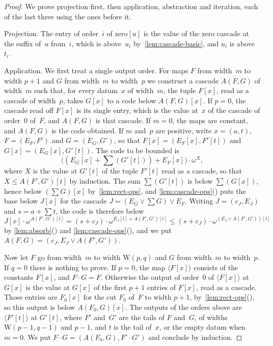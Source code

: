 \documentclass[11pt]{amsart}
\newcommand{\bplus}{\mathbin{+}}
\newcommand{\btimes}{\mathbin{\cdot}}
\newcommand{\W}{\mathrm{W}}
\newcommand{\tsum}[1]{\textstyle\sum #1}
\newcommand{\act}[2]{#1[#2]}                  %
\newcommand{\rd}[1]{\langle #1 \rangle}       %
\theoremstyle{plain}
\theoremstyle{definition}
\begin{document}
\begin{proof}
We prove projection first, then application, abstraction and
iteration, each of the last three using the ones before it.

Projection. The entry of order~$i$ of $\act{\mathrm{zero}}{u}$ is the
value of the zero cascade at the suffix of~$u$ from~$i$, which is
above~$u_i$ by~\cref{lem:cascade-basic}, and $u_i$ is above~$t_i$.

Application. We first treat a single output order. For maps $F$ from
width~$m$ to width $p+1$ and $G$ from width~$m$ to width~$p$ we
construct a cascade $A(F,G)$ of width~$m$ such that, for every
datum~$x$ of width~$m$, the tuple $\act F x$, read as a cascade of
width~$p$, takes $\act G x$ to a code below $\act{A(F,G)}{x}$. If
$p = 0$, the cascade read off $\act F x$ is its single entry, which is
the value at~$x$ of the cascade of order~$0$ of~$F$, and $A(F,G)$ is
that cascade. If $m = 0$, the maps are constant, and $A(F,G)$ is the
code obtained. If $m$ and~$p$ are positive, write $x = (a,t)$,
$F = (E_F, F')$ and $G = (E_G, G')$, so that
$\act F x = (\act{E_F}{x}, \act{F'}{t})$ and
$\act G x = (\act{E_G}{x}, \act{G'}{t})$. The code to be bounded is
\[
  \big((\act{E_G}{x} \bplus \tsum(\act{G'}{t})) \bplus
  \act{E_F}{x}\big) \btimes \omega^{X} ,
\]
where $X$ is the value at $\act{G'}{t}$ of the tuple $\act{F'}{t}$
read as a cascade, so that $X \le \act{A(F',G')}{t}$ by induction. The
sum $\tsum(\act{G'}{t})$ is below $\tsum(\act G x)$, hence below
$\act{(\tsum G)}{x}$ by~\cref{lem:rect-ops}, and
\cref{lem:cascade-ops}() puts the base below
$\act J x$ for the cascade $J = (E_G \vee \tsum G) \vee E_F$. Writing
$J = (c_J, E_J)$ and $s = a \bplus \tsum t$, the code is therefore
below
\[
  \act J x \btimes \omega^{\act{A(F',G')}{t}}
  = (s \bplus c_J) \btimes
    \omega^{\act{E_J}{t} \bplus \act{A(F',G')}{t}}
  \le (s \bplus c_J) \btimes
    \omega^{\act{(E_J \vee A(F',G'))}{t}}
\]
by \cref{lem:absorb}() and
\cref{lem:cascade-ops}(), and we put
$A(F,G) = (c_J, E_J \vee A(F',G'))$.

Now let $F$ go from width~$m$ to width $\W(p,q)$ and $G$ from
width~$m$ to width~$p$. If $q = 0$ there is nothing to prove. If
$p = 0$, the map $\rd{\act F x}$ consists of the constants
$\act F x$, and $F \cdot G = F$. Otherwise the output of order~$0$
of $\rd{\act F x}$ at $\act G x$ is the value at $\act G x$ of the
first $p+1$ entries of $\act F x$, read as a cascade. Those entries
are $\act{F_0}{x}$ for the cut $F_0$ of~$F$ to width $p+1$,
by~\cref{lem:rect-ops}(), so this output is
below $\act{A(F_0,G)}{x}$. The outputs of the orders above are
$\rd{\act{F'}{t}}$ at $\act{G'}{t}$, where $F'$ and~$G'$ are the
tails of $F$ and~$G$, of widths $\W(p-1,q-1)$ and $p-1$, and $t$ is
the tail of~$x$, or the empty datum when $m = 0$. We put
$F \cdot G = (A(F_0,G), F' \cdot G')$ and conclude by induction.


\end{proof}
\end{document}
